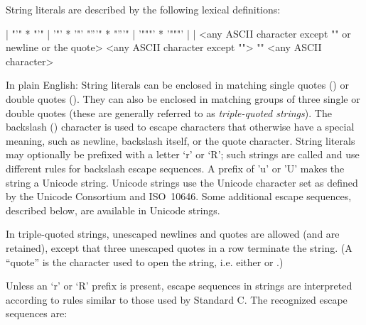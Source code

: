 String literals are described by the following lexical definitions:

\begin{productionlist}
             { | }
             {"'" * "'"
              | '"' * '"'}
             {"'''" * "'''"
              | '"""' * '"""'}
             { | }
             { | }
             {<any ASCII character except "\e" or newline or the quote>}
             {<any ASCII character except "\e">}
             {"\e" <any ASCII character>}
\end{productionlist}

In plain English: String literals can be enclosed in matching single
quotes () or double quotes ().  They can also be
enclosed in matching groups of three single or double quotes (these
are generally referred to as \emph{triple-quoted strings}).  The
backslash (\code{\e}) character is used to escape characters that
otherwise have a special meaning, such as newline, backslash itself,
or the quote character.  String literals may optionally be prefixed
with a letter `r' or `R'; such strings are called
 and use different rules for
backslash escape sequences.  A prefix of 'u' or 'U' makes the string
a Unicode string.  Unicode strings use the Unicode character set as
defined by the Unicode Consortium and ISO~10646.  Some additional
escape sequences, described below, are available in Unicode strings.

In triple-quoted strings,
unescaped newlines and quotes are allowed (and are retained), except
that three unescaped quotes in a row terminate the string.  (A
``quote'' is the character used to open the string, i.e. either
 or .)

Unless an `r' or `R' prefix is present, escape sequences in strings
are interpreted according to rules similar
to those used by Standard C.  The recognized escape sequences are:

